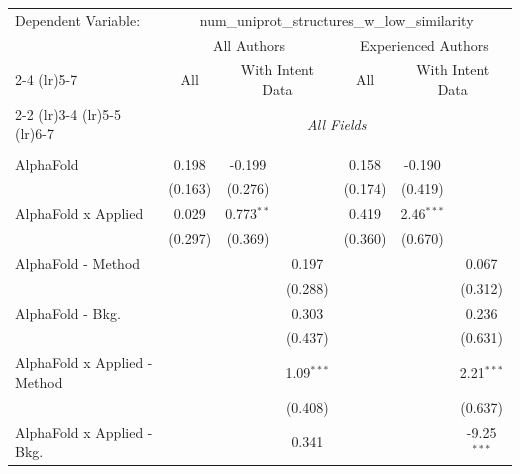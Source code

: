 \begingroup
\centering
\begin{tabular}{lcccccc}
   \tabularnewline \midrule \midrule
   Dependent Variable: & \multicolumn{6}{c}{num\_uniprot\_structures\_w\_low\_similarity}\\
 & \multicolumn{3}{c}{All Authors} & \multicolumn{3}{c}{Experienced Authors} \\
\cmidrule(lr){2-4} \cmidrule(lr){5-7}
 & \multicolumn{1}{c}{All} & \multicolumn{2}{c}{With Intent Data} & \multicolumn{1}{c}{All} & \multicolumn{2}{c}{With Intent Data} \\
\cmidrule(lr){2-2} \cmidrule(lr){3-4} \cmidrule(lr){5-5} \cmidrule(lr){6-7}
 & \multicolumn{6}{c}{\textit{All Fields}} \\ \\
   AlphaFold                      & 0.198         & -0.199       &               & 0.158         & -0.190       &   \\   
                                  & (0.163)       & (0.276)      &               & (0.174)       & (0.419)      &   \\   
   AlphaFold x Applied            & 0.029         & 0.773$^{**}$ &               & 0.419         & 2.46$^{***}$ &   \\   
                                  & (0.297)       & (0.369)      &               & (0.360)       & (0.670)      &   \\   
   AlphaFold - Method             &               &              & 0.197         &               &              & 0.067\\   
                                  &               &              & (0.288)       &               &              & (0.312)\\   
   AlphaFold - Bkg.               &               &              & 0.303         &               &              & 0.236\\   
                                  &               &              & (0.437)       &               &              & (0.631)\\   
   AlphaFold x Applied - Method   &               &              & 1.09$^{***}$  &               &              & 2.21$^{***}$\\   
                                  &               &              & (0.408)       &               &              & (0.637)\\   
   AlphaFold x Applied - Bkg.     &               &              & 0.341         &               &              & -9.25$^{***}$\\   

\end{tabular}
